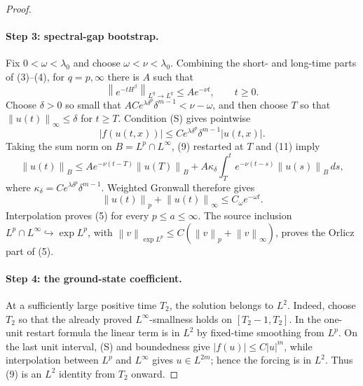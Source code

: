 \documentclass[11pt]{article}
\newcommand{\cE}{\exp L^p}
\newcommand{\norm}[1]{\left\lVert #1\right\rVert}
\begin{document}
\begin{proof}
\paragraph{Step 3: spectral-gap bootstrap.}
Fix \(0<\omega<\lambda_0\) and choose
\(\omega<\nu<\lambda_0\).  Combining the short- and long-time parts of
(3)--(4), for \(q=p,\infty\) there is \(A\) such that
\begin{equation}
 \norm{e^{-tH^\beta}}_{L^q\to L^q}\leq A e^{-\nu t},
 \qquad t\geq0.                                        \tag{11}
\end{equation}
Choose \(\delta>0\) so small that
\(A C e^{\lambda\delta^p}\delta^{m-1}<\nu-\omega\), and then choose
\(T\) so that \(\norm{u(t)}_\infty\leq\delta\) for \(t\geq T\).
Condition (S) gives pointwise
\[
 |f(u(t,x))|\leq C e^{\lambda\delta^p}\delta^{m-1}|u(t,x)|.
\]
Taking the sum norm on \(B=L^p\cap L^\infty\), (9) restarted at \(T\)
and (11) imply
\[
 \norm{u(t)}_B\leq A e^{-\nu(t-T)}\norm{u(T)}_B
 +A\kappa_\delta\int_T^t e^{-\nu(t-s)}\norm{u(s)}_B\,ds,
\]
where \(\kappa_\delta=C e^{\lambda\delta^p}\delta^{m-1}\).
Weighted Gronwall therefore gives
\begin{equation}
 \norm{u(t)}_p+\norm{u(t)}_\infty\leq C_\omega e^{-\omega t}.
                                                               \tag{12}
\end{equation}
Interpolation proves (5) for every \(p\leq a\leq\infty\).  The source
inclusion
\(L^p\cap L^\infty\hookrightarrow\exp L^p\), with
\(\norm{v}_{\cE}\leq C(\norm{v}_p+\norm{v}_\infty)\), proves the Orlicz
part of (5).

\paragraph{Step 4: the ground-state coefficient.}
At a sufficiently large positive time \(T_2\), the solution belongs to
\(L^2\).  Indeed, choose \(T_2\) so that the already proved
\(L^\infty\)-smallness holds on \([T_2-1,T_2]\).  In the one-unit restart
formula the linear term is in \(L^2\) by fixed-time smoothing from \(L^p\).
On the last unit interval, (S) and boundedness give
\(|f(u)|\leq C|u|^m\), while interpolation between \(L^p\) and
\(L^\infty\) gives \(u\in L^{2m}\); hence the forcing is in \(L^2\).
Thus (9) is an \(L^2\) identity from \(T_2\) onward.


\end{proof}
\end{document}
